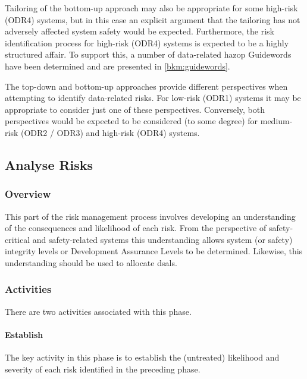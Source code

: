 Tailoring of the bottom-up approach may also be appropriate for some high-risk (ODR4) systems, but in this case an explicit argument that the tailoring has not adversely affected system safety would be expected. Furthermore, the risk identification process for high-risk (ODR4) systems is expected to be a highly structured affair. To support this, a number of data-related \gls{hazop} Guidewords have been determined
and are presented in \autoref{bkm:guidewords}.

The top-down and bottom-up approaches provide different perspectives when attempting to identify data-related risks. For low-risk (ODR1) systems it may be appropriate to consider just one of these perspectives. Conversely, both perspectives would be expected to be considered (to some degree) for medium-risk (ODR2 / ODR3) and high-risk (ODR4) systems.
%
\subsection{Analyse Risks}
\subsubsection{Overview}
This part of the risk management process involves developing an understanding of the consequences and likelihood of each risk. From the perspective of safety-critical and safety-related systems this understanding allows system (or safety) \gls{integrity} levels or Development Assurance Levels to be determined. Likewise, this understanding should be used to allocate
\glspl{dsal}.
%
%
\subsubsection{Activities}
There are two activities associated with this phase.
%
\paragraph{Establish }
\label{bkm:DSAL-table-section}
The key activity in this phase is to establish the (untreated) likelihood and severity of each risk identified in the preceding phase.

